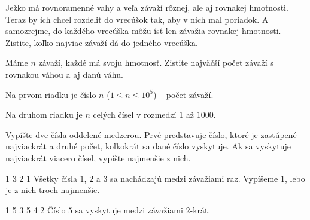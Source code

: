 




Ježko má rovnoramenné vahy a veľa závaží rôznej, ale aj rovnakej hmotnosti. Teraz by ich chcel
rozdeliť do vrecúšok tak, aby v nich mal poriadok. A samozrejme, do každého vrecúška môžu ísť len závažia
rovnakej hmotnosti. Zistite, koľko najviac závaží dá do jedného vrecúška.


Máme $n$ závaží, každé má svoju hmotnosť. Zistite najväčší počet závaží s rovnakou váhou a aj danú
váhu.


Na prvom riadku je číslo $n$ ($1 \leq n \leq 10^5$) -- počet závaží.

Na druhom riadku je $n$ celých čísel v rozmedzí $1$ až $1000$.


Vypíšte dve čísla oddelené medzerou. Prvé predstavuje číslo, ktoré je zastúpené najviackrát a druhé
počet, koľkokrát sa dané číslo vyskytuje. Ak sa vyskytuje najviackrát viacero čísel, vypíšte najmenšie
z nich.


1 3 2
 1
\komentar
Všetky čísla $1$, $2$ a $3$ sa nachádzajú medzi závažiami raz. Vypíšeme $1$, lebo je z nich troch
najmenšie.
\koniec

1 5 3 5 4
 2
\komentar
Číslo $5$ sa vyskytuje medzi závažiami $2$-krát.
\koniec



